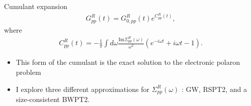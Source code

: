 \documentclass[aspectratio=169]{beamer}
\begin{document}
\begin{frame}{Cumulant expansion}
\begin{align} G^R_{pp}(t) = G_{0,pp}^R(t) e^{C_{pp}^R(t)}, \label{eq:cumulant_G}\end{align}
\pause where \begin{align} C_{pp}^R(t) = -\frac{1}{\pi}\int d\omega \frac{\mathrm{Im} \Sigma_{pp}^R(\omega)}{\omega^2} \left(e^{-i\omega t} + i \omega t -1\right). \label{eq:cumulant}\end{align}
\pause
\begin{itemize}
  \item This form of the cumulant is the exact solution to the electronic polaron problem \pause
  \item I explore three different approximations for $\Sigma^R_{pp}(\omega)$ : GW, RSPT2, and a size-consistent BWPT2.
\end{itemize}
\end{frame}
\end{document}
